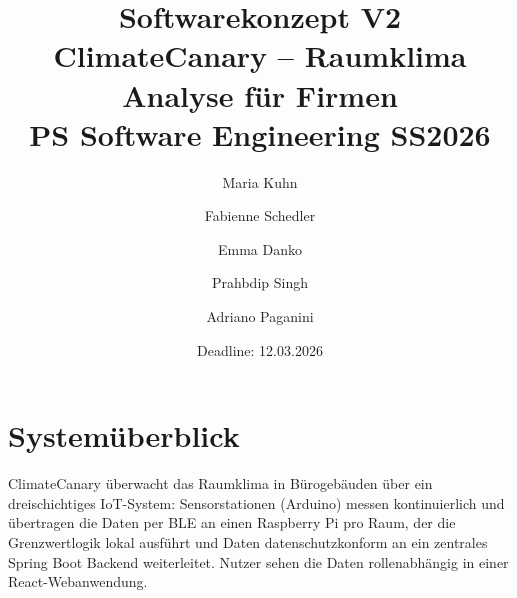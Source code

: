\documentclass[12pt,a4paper]{article}
\title{\textbf{Softwarekonzept V2}\\

\large ClimateCanary -- Raumklima Analyse für Firmen\\

PS Software Engineering SS2026}
\date{Deadline: 12.03.2026}
\author{
  Maria Kuhn \and Fabienne Schedler \and Emma Danko \and Prahbdip Singh \and Adriano Paganini
}
\begin{document}
\maketitle

\tableofcontents
\newpage

\section{Systemüberblick}

ClimateCanary überwacht das Raumklima in Bürogebäuden über ein dreischichtiges
IoT-System: Sensorstationen (Arduino) messen kontinuierlich und übertragen die Daten
per BLE an einen Raspberry Pi pro Raum, der die Grenzwertlogik lokal ausführt und
Daten datenschutzkonform an ein zentrales Spring Boot Backend weiterleitet. Nutzer
sehen die Daten rollenabhängig in einer React-Webanwendung.
\end{document}
